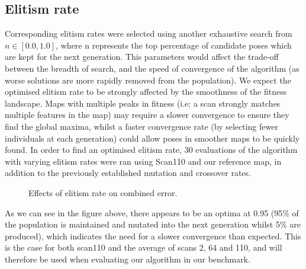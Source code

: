 \documentclass[authoryearcitations]{UoYCSproject}
\begin{document}
\subsection{Elitism rate}
\label{subsec:elite_elitism_rate}
Corresponding elitism rates were selected using another exhaustive search from $n \in [0.0,1.0]$, where n represents the top percentage of candidate poses which are kept for the next generation. This parameters would affect the trade-off between the breadth of search, and the speed of convergence of the algorithm (as worse solutions are more rapidly removed from the population). We expect the optimised elitism rate to be strongly affected by the smoothness of the fitness landscape. Maps with multiple peaks in fitness (i.e: a scan strongly matches multiple features in the map) may require a slower convergence to ensure they find the global maxima, whilst a faster convergence rate (by selecting fewer individuals at each generation) could allow poses in smoother maps to be quickly found. In order to find an optimised elitism rate, 30 evaluations of the algorithm with varying elitism rates were ran using Scan110 and our reference map, in addition to the previously established mutation and crossover rates. \newline

\begin{figure}
	\centering
	\caption[Optimising elitism rate for scan/map]{Effects of elitism rate on combined error.}
	\label{fig:elitsm_rates}
\end{figure}
As we can see in the figure above, there appears to be an optima at 0.95 (95\% of the population is maintained and mutated into the next generation whilst 5\% are produced), which indicates the need for a slower convergence than expected. This is the case for both scan110 and the average of scans 2, 64 and 110, and will therefore be used when evaluating our algorithm in our benchmark.
\end{document}

